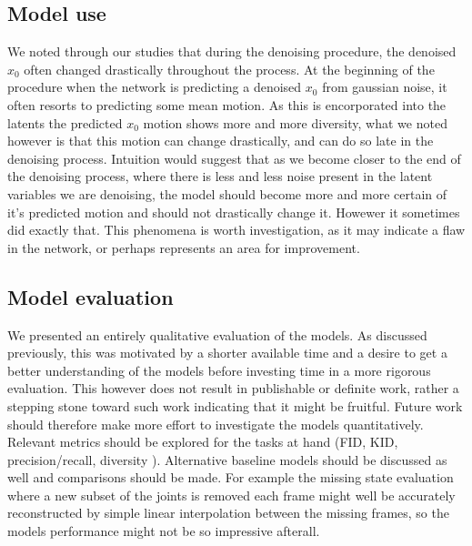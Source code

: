 \subsection{Model use}

We noted through our studies that during the denoising procedure, the denoised $x_0$ often changed drastically throughout the process. At the beginning of the procedure when the network is predicting a denoised $x_0$ from gaussian noise, it often resorts to predicting some mean motion. As this is encorporated into the latents the predicted $x_0$ motion shows more and more diversity, what we noted however is that this motion can change drastically, and can do so late in the denoising process. Intuition would suggest that as we become closer to the end of the denoising process, where there is less and less noise present in the latent variables we are denoising, the model should become more and more certain of it's predicted motion and should not drastically change it. Howewer it sometimes did exactly that. This phenomena is worth investigation, as it may indicate a flaw in the network, or perhaps represents an area for improvement.

\subsection{Model evaluation}
\label{sec:future_work_evaluation}

We presented an entirely qualitative evaluation of the models. As discussed previously, this was motivated by a shorter available time and a desire to get a better understanding of the models before investing time in a more rigorous evaluation. This however does not result in publishable or definite work, rather a stepping stone toward such work indicating that it might be fruitful. Future work should therefore make more effort to investigate the models quantitatively. Relevant metrics should be explored for the tasks at hand (FID, KID, precision/recall, diversity \cite{Paper_with_useful_metrics_cited_by_MDM}). Alternative baseline models should be discussed as well and comparisons should be made. For example the missing state evaluation where a new subset of the joints is removed each frame might well be accurately reconstructed by simple linear interpolation between the missing frames, so the models performance might not be so impressive afterall.

            
